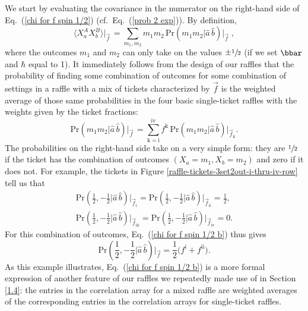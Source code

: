 We start by evaluating the covariance in the numerator on the right-hand side of Eq.\ (\ref{chi for f spin 1/2}) (cf.\ Eq.\ (\ref{prob 2 exp})). By definition,
\begin{equation}
\langle X^A_a X^B_b \rangle \big|_{\vec{f}\,} = \!\! \sum_{m_1, m_2} \! m_1  m_2 \, \mathrm{Pr}(m_1 m_2| \hat{a} \,\hat{b}) \Big|_{\vec{f}} \;, 
 \label{chi for f spin 1/2 a}
\end{equation}
where the outcomes $m_1$ and $m_2$ can only take on the values $\pm \sfrac12$ (if we set $\bbar$ and $\hbar$ equal to 1). It immediately follows from the design of our raffles that the probability of finding some combination of outcomes for some combination of settings in a raffle with a mix of tickets characterized by $\vec{f}$ is the weighted average of those same probabilities in the four basic single-ticket raffles with the weights given by the ticket fractions:
\begin{equation}
\mathrm{Pr}(m_1 m_2| \hat{a} \,\hat{b}) \big|_{\vec{f}\,} = \sum_{\mathrm{k} = \mathrm{i}}^{\mathrm{iv}} f^{\mathrm{k}} \, \mathrm{Pr}(m_1 m_2| \hat{a} \,\hat{b}) 
\Big|_{\vec{f}_{\mathrm{k}}}.
\label{chi for f spin 1/2 b}
\end{equation}
The probabilities on the right-hand side take on a very simple form: they are $\sfrac12$ if the ticket has the combination of outcomes $(X_a = m_1, X_b = m_2)$ and zero if it does not. For example, the tickets in Figure \ref{raffle-tickets-3set2out-i-thru-iv-row} tell us that 
\begin{equation}
\begin{array}{c}
 \mathrm{Pr}\!\left({\textstyle \frac12}, -{\textstyle \frac12} \Big| \hat{a} \,\hat{b}\right) \Big|_{\vec{f}_{\mathrm{i}}} 
 = \mathrm{Pr}\!\left({\textstyle \frac12}, -{\textstyle \frac12} \Big| \hat{a} \,\hat{b}\right) \Big|_{\vec{f}_{\mathrm{ii}}} \! = {\displaystyle{\frac12}}, \\[.6cm]
\mathrm{Pr}\!\left({\textstyle \frac12}, -{\textstyle \frac12} \Big| \hat{a} \,\hat{b}\right) \Big|_{\vec{f}_{\mathrm{iii}}} 
\!\! = \mathrm{Pr}\!\left({\textstyle \frac12}, -{\textstyle \frac12} \Big| \hat{a} \,\hat{b}\right) \Big|_{\vec{f}_{\mathrm{iv}}} \!\! = 0. 
\end{array}
\label{chi for f spin 1/2 ba}
\end{equation}
For this combination of outcomes, Eq.\ (\ref{chi for f spin 1/2 b}) thus gives
\begin{equation}
\mathrm{Pr}\!\left({\textstyle \frac12}, -{\textstyle \frac12} \Big| \hat{a} \,\hat{b}\right) \Big|_{\vec{f}} = \frac12 \big( f^{\mathrm{i}} + f^{\mathrm{ii}} \big).
\end{equation}
As this example illustrates, Eq.\ (\ref{chi for f spin 1/2 b}) is a more formal expression of another feature of our raffles we repeatedly made use of in Section \ref{1.4}: the entries in the correlation array for a mixed raffle are weighted averages of the corresponding entries in the correlation arrays for single-ticket raffles. 

